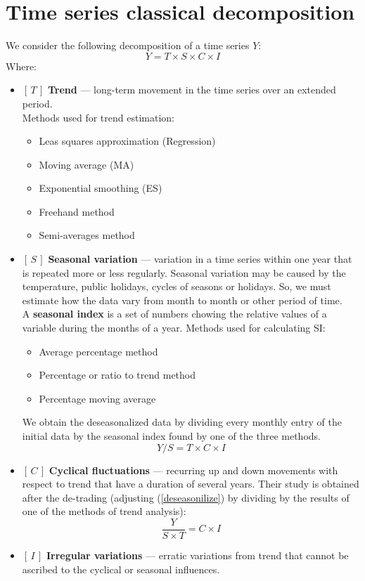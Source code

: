 \documentclass[12pt, english]{article}
\numberwithin{equation}{section} %
\theoremstyle{plain}
\theoremstyle{definition}
\begin{document}
\section{Time series classical decomposition}
We consider the following decomposition of a time series $Y$:
\begin{equation}
	Y = T \times S \times C \times I
\end{equation}
Where:
\begin{itemize}
	\item $[\, T \,]$ \textbf{Trend} --- long-term movement in the time series over an extended period. \\
		
		Methods used for trend estimation:
		\begin{itemize}
			\item Leas squares approximation (Regression) 
			\item Moving average (MA)
			\item Exponential smoothing (ES)
			\item Freehand method
			\item Semi-averages method
		\end{itemize} 
	\item $[\, S \,]$ \textbf{Seasonal variation} --- variation in a time series within one year that is repeated more or less regularly. Seasonal variation may be caused by the temperature, public holidays, cycles of seasons or holidays. So, we must estimate how the data vary from month to month or other period of time. \\
		
		A \textbf{seasonal index} is a set of numbers chowing the relative values of a variable during the months of a year. Methods used for calculating SI:
		\begin{itemize}
			\item Average percentage method
			\item Percentage or ratio to trend method
			\item Percentage moving average
		\end{itemize}
		
		We obtain the deseasonalized data by dividing every monthly entry of the initial data by the seasonal index found by one of the three methods.
		\begin{equation}
		\label{deseasonilize}
			Y / S = T \times C \times I
		\end{equation}
	\item $[\, C \,]$ \textbf{Cyclical fluctuations} --- recurring up and down movements with respect to trend that have a duration of several years. Their study is obtained after the de-trading (adjusting (\ref{deseasonilize}) by dividing by the results of one of the methods of trend analysis):
		\begin{equation}
			\frac{Y}{S \times T} = C \times I
		\end{equation}
	\item $[\, I \,]$ \textbf{Irregular variations} --- erratic variations from trend that cannot be ascribed to the cyclical or seasonal influences.
\end{itemize}
\end{document}
